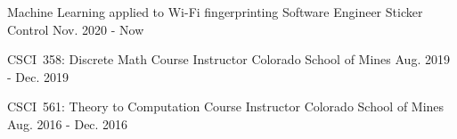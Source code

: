 

\begin{cventries}
	
	\cventry
	{Machine Learning applied to Wi-Fi fingerprinting} %
	{Software Engineer} %
	{Sticker Control} %
	{Nov. 2020 - Now} %
	{}
	
	\cventry
	{CSCI~358: Discrete Math} %
	{Course Instructor} %
	{Colorado School of Mines} %
	{Aug. 2019 - Dec. 2019} %
	{}

	\cventry
	{CSCI~561: Theory to Computation} %
	{Course Instructor} %
	{Colorado School of Mines} %
	{Aug. 2016 - Dec. 2016} %
	{}
	
	
\end{cventries}
